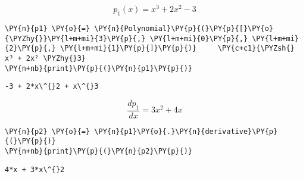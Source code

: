 \begin{example}
\[ p_1(x) = x^3 + 2x^2 - 3\]

\begin{tcolorbox}[breakable, size=fbox, boxrule=1pt, pad at break*=1mm,colback=cellbackground, colframe=cellborder]
\begin{Verbatim}[commandchars=\\\{\}]
\PY{n}{p1} \PY{o}{=} \PY{n}{Polynomial}\PY{p}{(}\PY{p}{[}\PY{o}{\PYZhy{}}\PY{l+m+mi}{3}\PY{p}{,} \PY{l+m+mi}{0}\PY{p}{,} \PY{l+m+mi}{2}\PY{p}{,} \PY{l+m+mi}{1}\PY{p}{]}\PY{p}{)}     \PY{c+c1}{\PYZsh{} x³ + 2x² \PYZhy{}3}
\PY{n+nb}{print}\PY{p}{(}\PY{n}{p1}\PY{p}{)}
\end{Verbatim}
\end{tcolorbox}

\begin{Verbatim}[commandchars=\\\{\}]
-3 + 2*x\^{}2 + x\^{}3
\end{Verbatim}

\[ \dfrac{dp_1}{dx} = 3x^2 + 4x \]

\begin{tcolorbox}[breakable, size=fbox, boxrule=1pt, pad at break*=1mm,colback=cellbackground, colframe=cellborder]
\begin{Verbatim}[commandchars=\\\{\}]
\PY{n}{p2} \PY{o}{=} \PY{n}{p1}\PY{o}{.}\PY{n}{derivative}\PY{p}{(}\PY{p}{)}
\PY{n+nb}{print}\PY{p}{(}\PY{n}{p2}\PY{p}{)}
\end{Verbatim}
\end{tcolorbox}

\begin{Verbatim}[commandchars=\\\{\}]
4*x + 3*x\^{}2
\end{Verbatim}
\end{example}

    
    
    
